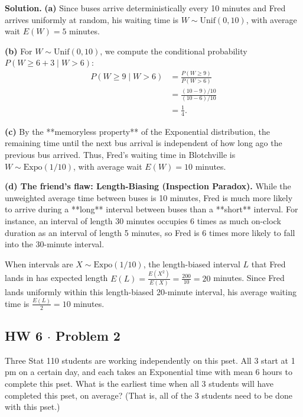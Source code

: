 \documentclass[11pt,a4paper]{article}
\begin{document}
\noindent \textbf{Solution.} \textbf{(a)} Since buses arrive deterministically every 10 minutes and Fred arrives uniformly at random, his waiting time is $W \sim \text{Unif}(0, 10)$, with average wait $E(W) = 5$ minutes.

\vspace{4pt}
\noindent \textbf{(b)} For $W \sim \text{Unif}(0, 10)$, we compute the conditional probability $P(W \ge 6 + 3 \mid W > 6)$:
\begin{align*}
P(W \ge 9 \mid W > 6) &= \frac{P(W \ge 9)}{P(W > 6)} \\
&= \frac{(10 - 9)/10}{(10 - 6)/10} \\
&= \frac{1}{4}.
\end{align*}

\vspace{4pt}
\noindent \textbf{(c)} By the **memoryless property** of the Exponential distribution, the remaining time until the next bus arrival is independent of how long ago the previous bus arrived. Thus, Fred's waiting time in Blotchville is $W \sim \text{Expo}(1/10)$, with average wait $E(W) = 10$ minutes.

\vspace{4pt}
\noindent \textbf{(d) The friend's flaw: Length-Biasing (Inspection Paradox).} 
While the unweighted average time between buses is 10 minutes, Fred is much more likely to arrive during a **long** interval between buses than a **short** interval. For instance, an interval of length 30 minutes occupies 6 times as much on-clock duration as an interval of length 5 minutes, so Fred is 6 times more likely to fall into the 30-minute interval. 

When intervals are $X \sim \text{Expo}(1/10)$, the length-biased interval $L$ that Fred lands in has expected length $E(L) = \frac{E(X^2)}{E(X)} = \frac{200}{10} = 20$ minutes. Since Fred lands uniformly within this length-biased 20-minute interval, his average waiting time is $\frac{E(L)}{2} = 10$ minutes.

\vspace{10pt}
\subsection{HW 6 $\cdot$ Problem 2}
\begin{tcolorbox}[title={HW 6 $\cdot$ Problem 2}]
Three Stat 110 students are working independently on this pset. All 3 start at 1 pm on a certain day, and each takes an Exponential time with mean 6 hours to complete this pset. What is the earliest time when all 3 students will have completed this pset, on average? (That is, all of the 3 students need to be done with this pset.)
\end{tcolorbox}
\end{document}
